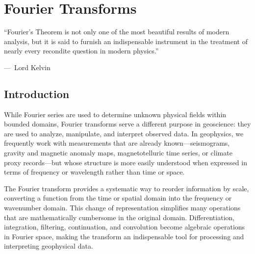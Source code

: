 \chapter{Fourier Transforms}\label{ch:fourier}





\epigraph{ ``Fourier's Theorem is not only one of the most beautiful results of modern analysis, but it is said to furnish an indispensable instrument in the treatment of nearly every recondite question in modern physics.''}
{{\normalfont ---\ Lord Kelvin}}

\section*{Introduction}

While Fourier series are used to determine unknown physical fields within bounded domains, Fourier transforms serve a different purpose in geoscience: they are used to analyze, manipulate, and interpret observed data. In geophysics, we frequently work with measurements that are already known—seismograms, gravity and magnetic anomaly maps, magnetotelluric time series, or climate proxy records—but whose structure is more easily understood when expressed in terms of frequency or wavelength rather than time or space.

The Fourier transform provides a systematic way to reorder information by scale, converting a function from the time or spatial domain into the frequency or wavenumber domain. This change of representation simplifies many operations that are mathematically cumbersome in the original domain. Differentiation, integration, filtering, continuation, and convolution become algebraic operations in Fourier space, making the transform an indispensable tool for processing and interpreting geophysical data.

